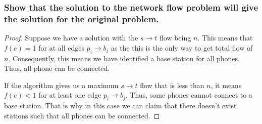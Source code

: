 \documentclass[11pt]{scrartcl}
\begin{document}
\subsubsection{
	Show that the solution to the network flow problem will give the solution for
	the original problem.
}


\begin{proof}
	Suppose we have a solution with the $s \rightarrow t$ flow being $n$.
	This means that $f(e) = 1$ for at all edges $p_i \rightarrow b_j$ as the this is the only
	way to get total flow of $n$. Consequently, this means we have identified
	a base station for all phones.  Thus, all phone can be connected.

	If the algorithm gives us a maximum $s \rightarrow t$ flow that is less than $n$,
	it means $f(e) < 1$ for at least one edge $p_i \rightarrow b_j$.
	Thus, some phones cannot connect to a base station.
	That is why in this case we can claim that there doesn't exist stations such that
	all phones can be connected.
\end{proof}
\fi
\end{document}
